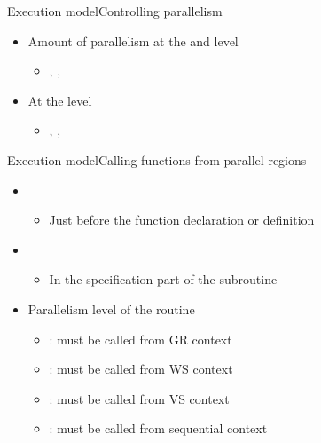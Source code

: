 \documentclass[12pt,aspectratio=169]{beamer}
\begin{document}
\begin{frame}[fragile]{Execution model}{Controlling parallelism}
  \begin{itemize}
  \item Amount of parallelism at the  and
     level
    \begin{itemize}
    \item {}, ,
    \end{itemize}
  \item At the  level
    \begin{itemize}
    \item {}, , 
    \end{itemize}
  \end{itemize}

\end{frame}

\begin{frame}[fragile]{Execution model}{Calling functions from parallel regions}
  \begin{itemize}
  \item {}
    \begin{itemize}
    \item Just before the function declaration or definition
    \end{itemize}
  \item {}
    \begin{itemize}
    \item In the specification part of the subroutine
    \end{itemize}
  \item Parallelism level of the routine
    \begin{itemize}
    \item {}: must be called from GR context
    \item {}: must be called from WS context
    \item {}: must be called from VS context
    \item {}: must be called from sequential context
    \end{itemize}
  \end{itemize}
\end{frame}
\end{document}
